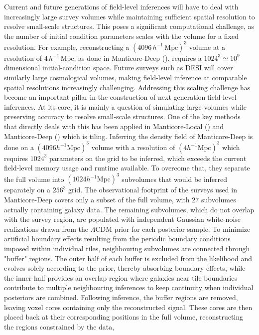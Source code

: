 Current and future generations of field-level inferences will have to deal with increasingly large survey volumes while maintaining sufficient spatial resolution to 
resolve small-scale structures. This poses a significant computational challenge, as the number of initial condition parameters scales with the volume for a fixed 
resolution. For example, reconstructing a $(4096\,h^{-1}\,\text{Mpc})^3$ volume at a resolution of $4\,h^{-1}\,\text{Mpc}$, as done in 
Manticore-Deep (\cite{Mcalpine_2026}), requires a $1024^3 \simeq 10^9$ dimensional initial-condition space. Future surveys such as DESI will 
cover similarly large cosmological volumes, making field-level inference at comparable spatial resolutions increasingly challenging. 
Addressing this scaling challenge has become an important pillar in the construction of next generation 
field-level inferences. 
At its core, it is mainly a question of simulating large volumes while preserving accuracy to resolve small-scale structures. 
One of the key methods that directly deals with this has been applied in Manticore-Local (\cite{Mcalpine_2025}) and Manticore-Deep (\cite{Mcalpine_2026}) which is tiling. 
Inferring the density field of Manticore-Deep is done on a $\left(4096 h^{-1} \text{Mpc}\right)^3$ volume with a resolution of $\left(4 h^{-1} \text{Mpc}\right)^3$ which 
requires $1024^3$ parameters on the grid to be inferred, which exceeds the current field-level memory usage and runtime available. To overcome that, they separate the full volume into 
$\left(1024 h^{-1} \text{Mpc}\right)^3$ subvolumes that would be inferred separately on a $256^3$ grid. 
The observational footprint of the surveys used in Manticore-Deep covers only a subset of the full volume, with 27 subvolumes actually containing galaxy data. 
The remaining subvolumes, which do not overlap with the survey region, are populated with independent Gaussian white-noise realizations drawn from the $\Lambda$CDM prior 
for each posterior sample. 
To minimize artificial boundary effects resulting from the periodic boundary conditions imposed within individual tiles, neighbouring subvolumes are connected through 
"buffer" regions. The outer half of each buffer is excluded from the likelihood and evolves solely according to the prior, thereby absorbing 
boundary effects, while the inner half provides an overlap region where galaxies near tile boundaries contribute to multiple neighbouring inferences to keep continuity 
when individual posteriors are combined. 
Following inference, the buffer regions are removed, leaving voxel cores containing only the reconstructed signal. These cores are then placed back at their corresponding positions in the full volume, reconstructing the regions constrained by the data, 
